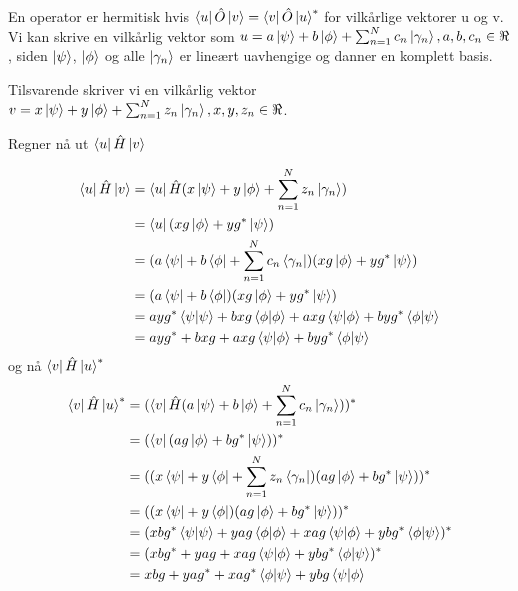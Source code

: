 \documentclass[norsk,a4paper,12pt]{article}
\begin{document}
		En operator er hermitisk hvis $\bra{u}\hat{O}\ket{v} = \bra{v}\hat{O}\ket{u}^*$ for vilkårlige vektorer u og v. Vi kan skrive en vilkårlig vektor som $u = a\ket{\psi} + b\ket{\phi} + \sum_{n=1}^{N}c_n \ket{\gamma_n}, a,b,c_n \in \real$, siden $\ket{\psi}$, $\ket{\phi}$ og alle $\ket{\gamma_n}$ er lineært uavhengige og danner en komplett basis.
		
		Tilsvarende skriver vi en vilkårlig vektor $v = x\ket{\psi} + y\ket{\phi} + \sum_{n=1}^{N}z_n \ket{\gamma_n}, x,y,z_n \in \real$.
		
		Regner nå ut $\bra{u}\hat{H}\ket{v}$
		
		\begin{equation}
		\begin{aligned}
		\bra{u}\hat{H}\ket{v} &= \bra{u}\hat{H}(x\ket{\psi} + y\ket{\phi} + \sum_{n=1}^{N}z_n \ket{\gamma_n}) \\
		&= \bra{u}(xg\ket{\phi} + yg^*\ket{\psi}) \\
		&= (a\bra{\psi} + b\bra{\phi} + \sum_{n=1}^{N}c_n \bra{\gamma_n})(xg\ket{\phi} + yg^*\ket{\psi}) \\
		&= (a\bra{\psi} + b\bra{\phi})(xg\ket{\phi} + yg^*\ket{\psi}) \\
		&= ayg^*\bra{\psi}\ket{\psi} + bxg\bra{\phi}\ket{\phi} + axg\bra{\psi}\ket{\phi} + byg^*\bra{\phi}\ket{\psi} \\
		&= ayg^* + bxg + axg\bra{\psi}\ket{\phi} + byg^*\bra{\phi}\ket{\psi}
		\end{aligned}
		\end{equation}
		og nå $\bra{v}\hat{H}\ket{u}^*$
		\begin{equation}
		\begin{aligned}
		\bra{v}\hat{H}\ket{u}^* &= (\bra{v}\hat{H}(a\ket{\psi} + b\ket{\phi} + \sum_{n=1}^{N}c_n \ket{\gamma_n}))^* \\
		&= (\bra{v}(ag\ket{\phi} + bg^*\ket{\psi}))^* \\
		&= ((x\bra{\psi} + y\bra{\phi} + \sum_{n=1}^{N}z_n \bra{\gamma_n})(ag\ket{\phi} + bg^*\ket{\psi}))^* \\
		&= ((x\bra{\psi} + y\bra{\phi})(ag\ket{\phi} + bg^*\ket{\psi}))^* \\
		&= (xbg^*\bra{\psi}\ket{\psi} + yag\bra{\phi}\ket{\phi} + xag\bra{\psi}\ket{\phi} + ybg^*\bra{\phi}\ket{\psi})^* \\
		&= (xbg^* + yag + xag\bra{\psi}\ket{\phi} + ybg^*\bra{\phi}\ket{\psi})^* \\
		&= xbg + yag^* + xag^*\bra{\phi}\ket{\psi} + ybg\bra{\psi}\ket{\phi}
		\end{aligned}
		\end{equation}
\end{document}
